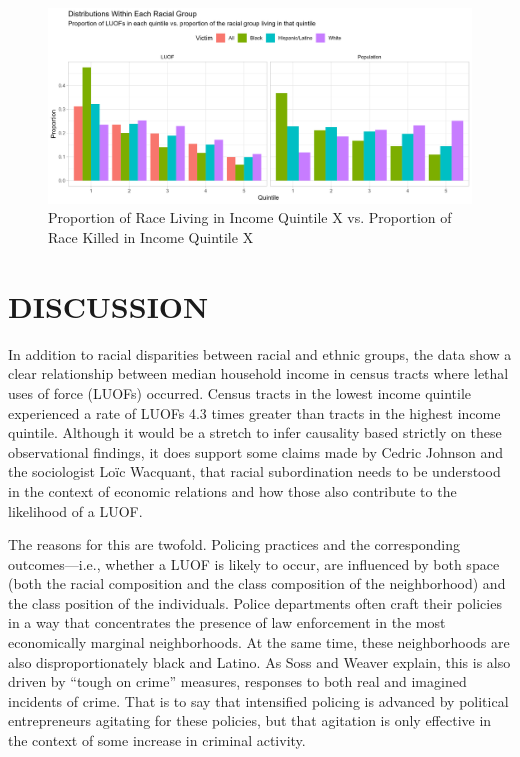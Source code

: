 \documentclass[12pt]{article}
\begin{document}
\begin{figure}[H]
  \centering
  \includegraphics[width=\linewidth]{images/inc_and_race_victim_shape_bar}
  \captionsetup{justification=centering, singlelinecheck=false, margin=2cm}
  \caption{Proportion of Race Living in Income Quintile X vs. Proportion of Race Killed in Income Quintile X}
  \label{fig:inc_and_race_victim_shape_bar}
\end{figure}

\section{DISCUSSION}

In addition to racial disparities between racial and ethnic groups, the data show a clear relationship between median household income in census tracts where lethal uses of force (LUOFs) occurred. Census tracts in the lowest income quintile experienced a rate of LUOFs 4.3 times greater than tracts in the highest income quintile. Although it would be a stretch to infer causality based strictly on these observational findings, it does support some claims made by Cedric Johnson and the sociologist Loïc Wacquant, that racial subordination needs to be understood in the context of economic relations and how those also contribute to the likelihood of a LUOF.

The reasons for this are twofold. Policing practices and the corresponding outcomes—i.e., whether a LUOF is likely to occur, are influenced by both space (both the racial composition and the class composition of the neighborhood) and the class position of the individuals. Police departments often craft their policies in a way that concentrates the presence of law enforcement in the most economically marginal neighborhoods. At the same time, these neighborhoods are also disproportionately black and Latino. As Soss and Weaver explain, this is also driven by “tough on crime” measures, responses to both real and imagined incidents of crime. That is to say that intensified policing is advanced by political entrepreneurs agitating for these policies, but that agitation is only effective in the context of some increase in criminal activity.
\end{document}
